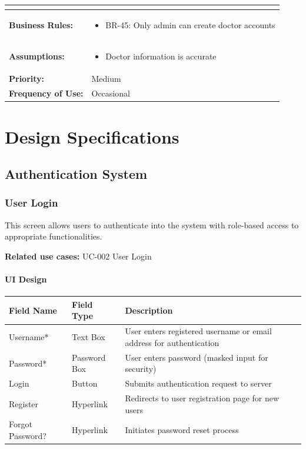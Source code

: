 \documentclass[12pt,a4paper]{article}
\begin{document}
\begin{longtable}{|p{4.5cm}|p{10.5cm}|}
\begin{itemize}
\end{itemize} \\
\hline
\textbf{Business Rules:} &
\begin{itemize}
  \item BR-45: Only admin can create doctor accounts
\end{itemize} \\
\hline
\textbf{Assumptions:} &
\begin{itemize}
  \item Doctor information is accurate
\end{itemize} \\
\hline
\textbf{Priority:} & Medium \\
\hline
\textbf{Frequency of Use:} & Occasional \\
\hline
\end{longtable}

\section{Design Specifications}

\subsection{Authentication System}

\subsubsection{User Login}

This screen allows users to authenticate into the system with role-based access to appropriate functionalities.

\textbf{Related use cases:} UC-002 User Login

\paragraph{UI Design}

\begin{longtable}{|p{3cm}|p{3cm}|p{8cm}|}
\hline
\textbf{Field Name} & \textbf{Field Type} & \textbf{Description} \\
\hline
Username* & Text Box & User enters registered username or email address for authentication \\
\hline
Password* & Password Box & User enters password (masked input for security) \\
\hline
Login & Button & Submits authentication request to server \\
\hline
Register & Hyperlink & Redirects to user registration page for new users \\
\hline
Forgot Password? & Hyperlink & Initiates password reset process \\
\hline
\end{longtable}
\end{document}
